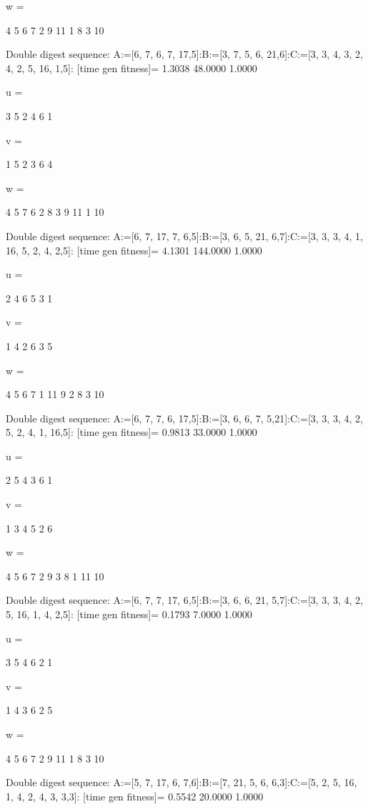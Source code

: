 w =

     4     5     6     7     2     9    11     1     8     3    10

Double digest sequence:
A:=[6, 7, 6, 7, 17,5]:B:=[3, 7, 5, 6, 21,6]:C:=[3, 3, 4, 3, 2, 4, 2, 5, 16, 1,5]:
[time gen fitness]=
    1.3038   48.0000    1.0000


u =

     3     5     2     4     6     1


v =

     1     5     2     3     6     4


w =

     4     5     7     6     2     8     3     9    11     1    10

Double digest sequence:
A:=[6, 7, 17, 7, 6,5]:B:=[3, 6, 5, 21, 6,7]:C:=[3, 3, 3, 4, 1, 16, 5, 2, 4, 2,5]:
[time gen fitness]=
    4.1301  144.0000    1.0000


u =

     2     4     6     5     3     1


v =

     1     4     2     6     3     5


w =

     4     5     6     7     1    11     9     2     8     3    10

Double digest sequence:
A:=[6, 7, 7, 6, 17,5]:B:=[3, 6, 6, 7, 5,21]:C:=[3, 3, 3, 4, 2, 5, 2, 4, 1, 16,5]:
[time gen fitness]=
    0.9813   33.0000    1.0000


u =

     2     5     4     3     6     1


v =

     1     3     4     5     2     6


w =

     4     5     6     7     2     9     3     8     1    11    10

Double digest sequence:
A:=[6, 7, 7, 17, 6,5]:B:=[3, 6, 6, 21, 5,7]:C:=[3, 3, 3, 4, 2, 5, 16, 1, 4, 2,5]:
[time gen fitness]=
    0.1793    7.0000    1.0000


u =

     3     5     4     6     2     1


v =

     1     4     3     6     2     5


w =

     4     5     6     7     2     9    11     1     8     3    10

Double digest sequence:
A:=[5, 7, 17, 6, 7,6]:B:=[7, 21, 5, 6, 6,3]:C:=[5, 2, 5, 16, 1, 4, 2, 4, 3, 3,3]:
[time gen fitness]=
    0.5542   20.0000    1.0000


